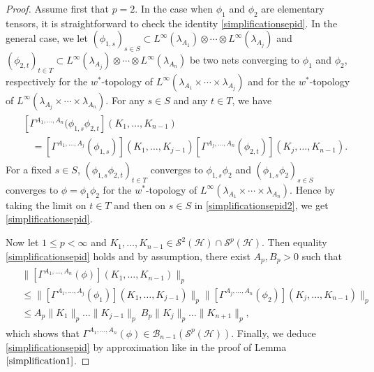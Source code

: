 \documentclass[12pt]{amsart}
\theoremstyle{remark}
\begin{document}
\begin{proof}
Assume first that $p=2$. In the case when $\phi_1$ and $\phi_2$ are elementary tensors, it is straightforward to check the identity \eqref{simplificationsepid}. In the general case, we let $(\phi_{1,s})_{s\in S} \subset L^{\infty}(\lambda_{A_1}) \otimes \cdots \otimes L^{\infty}(\lambda_{A_j})$ and $(\phi_{2,t})_{t\in T} \subset L^{\infty}(\lambda_{A_j}) \otimes \cdots \otimes L^{\infty}(\lambda_{A_n})$ be two nets converging to $\phi_1$ and $\phi_2$, respectively for the $w^*$-topology of $L^{\infty}(\lambda_{A_1} \times \cdots \times \lambda_{A_j})$ and for the $w^*$-topology of $L^{\infty}(\lambda_{A_j} \times \cdots \times \lambda_{A_n})$. For any $s \in S$ and any $t\in T$, we have
\begin{align}\label{simplificationsepid2}
\begin{split}
& \left[ \Gamma^{A_1, \ldots, A_n}(\phi_{1,s} \phi_{2,t} \right] (K_1, \ldots, K_{n-1}) \\
& \ \ \ \ = \left[ \Gamma^{A_1, \ldots, A_j}(\phi_{1,s})\right] (K_1, \ldots, K_{j-1}) \left[ \Gamma^{A_j, \ldots, A_n}(\phi_{2,t})\right] (K_j, \ldots, K_{n-1}).
\end{split}
\end{align}
For a fixed $s\in S$, $(\phi_{1,s} \phi_{2,t})_{t\in T}$ converges to $\phi_{1,s} \phi_2$ and $(\phi_{1,s} \phi_2)_{s\in S}$ converges to $\phi = \phi_1 \phi_2$ for the $w^*$-topology of $L^{\infty}(\lambda_{A_1} \times \cdots \times \lambda_{A_n})$. Hence by taking the limit on $t\in T$ and then on $s\in S$ in \eqref{simplificationsepid2}, we get \eqref{simplificationsepid}.

Now let $1 \leq p <\infty$ and $K_1, \ldots, K_{n-1} \in \mathcal{S}^2(\mathcal{H}) \cap \mathcal{S}^p(\mathcal{H})$. Then equality \eqref{simplificationsepid} holds and by assumption, there exist $A_p, B_p >0$ such that
\begin{align*}
\begin{split}
& \| \left[ \Gamma^{A_1, \ldots, A_n}(\phi)\right] (K_1, \ldots, K_{n-1})\|_p \\
& \leq \| \left[ \Gamma^{A_1, \ldots, A_j}(\phi_1)\right] (K_1, \ldots, K_{j-1}) \|_p \| \left[ \Gamma^{A_j, \ldots, A_n}(\phi_2)\right] (K_j, \ldots, K_{n-1}) \|_p \\
& \leq A_p \|K_1\|_p \ldots \|K_{j-1}\|_p ~ B_p \|K_j \|_p \ldots \|K_{n+1}\|_p,
\end{split}
\end{align*}
which shows that $\Gamma^{A_1, \ldots, A_n}(\phi) \in \mathcal{B}_{n-1}(\mathcal{S}^p(\mathcal{H}))$. Finally, we deduce \eqref{simplificationsepid} by approximation like in the proof of Lemma $\ref{simplification1}$.

\end{proof}
\end{document}
